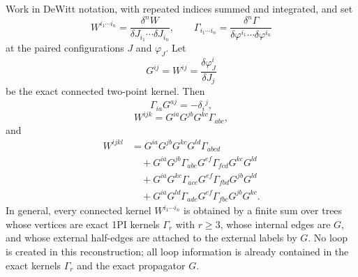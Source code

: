 \begin{proposition}
\label{prop:exact-1pi-tree-reconstruction}
Work in DeWitt notation, with repeated indices summed and integrated, and set
\[
  W^{i_1\cdots i_n}
  =
  \frac{\delta^nW}{\delta J_{i_1}\cdots\delta J_{i_n}},
  \qquad
  \Gamma_{i_1\cdots i_n}
  =
  \frac{\delta^n\Gamma}
       {\delta\varphi^{i_1}\cdots\delta\varphi^{i_n}}
\]
at the paired configurations \(J\) and \(\varphi_J\).  Let
\[
  G^{ij}=W^{ij}
  =
  \frac{\delta\varphi_J^i}{\delta J_j}
\]
be the exact connected two-point kernel.  Then
\begin{equation}
  \Gamma_{ia}G^{aj}=-\delta_i{}^j,
  \label{eq:exact-1pi-tree-two-point}
\end{equation}
\begin{equation}
  W^{ijk}
  =
  G^{ia}G^{jb}G^{kc}\Gamma_{abc},
  \label{eq:exact-1pi-tree-three-point}
\end{equation}
and
\begin{equation}
\begin{aligned}
  W^{ijkl}
  &=
  G^{ia}G^{jb}G^{kc}G^{ld}\Gamma_{abcd}
\\
  &\quad
  +G^{ia}G^{jb}\Gamma_{abe}G^{ef}\Gamma_{fcd}G^{kc}G^{ld}
\\
  &\quad
  +G^{ia}G^{kc}\Gamma_{ace}G^{ef}\Gamma_{fbd}G^{jb}G^{ld}
\\
  &\quad
  +G^{ia}G^{ld}\Gamma_{ade}G^{ef}\Gamma_{fbc}G^{jb}G^{kc}.
\end{aligned}
  \label{eq:exact-1pi-tree-four-point}
\end{equation}
In general, every connected kernel \(W^{i_1\cdots i_n}\) is obtained by a
finite sum over trees whose vertices are exact 1PI kernels
\(\Gamma_r\) with \(r\ge3\), whose internal edges are \(G\), and whose
external half-edges are attached to the external labels by \(G\).  No loop is
created in this reconstruction; all loop information is already contained in
the exact kernels \(\Gamma_r\) and the exact propagator \(G\).
\end{proposition}

